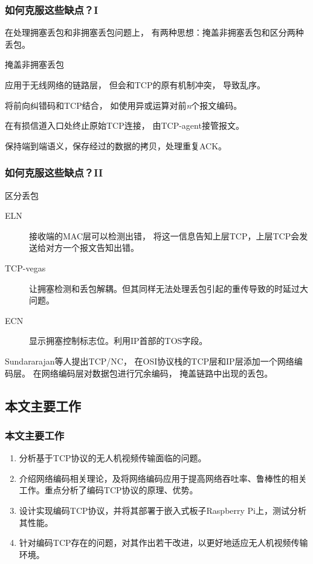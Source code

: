 \begin{frame}
	\frametitle{如何克服这些缺点？I}
	在处理拥塞丢包和非拥塞丢包问题上，
	有两种思想：掩盖非拥塞丢包和区分两种丢包。
	\begin{block}{掩盖非拥塞丢包}
		\begin{description}
			\footnotesize
			\item[ARQ] 应用于无线网络的链路层，
			但会和TCP的原有机制冲突，
			导致乱序。
			\item[FEC] 将前向纠错码和TCP结合，
			如使用异或运算对前\emph{n}个报文编码。
			\item[Indirect-TCP\footfullcite{Bakre1995I}] 在有损信道入口处终止原始TCP连接，
			由TCP-agent接管报文。
			\item[TCP-snoop\footfullcite{Balakrishnan1995Improving}] 保持端到端语义，保存经过的数据的拷贝，处理重复ACK。
		\end{description}
	\end{block}
\end{frame}

\begin{frame}
	\frametitle{如何克服这些缺点？II}
	\begin{block}{区分丢包}
		\footnotesize
		\begin{description}
			\item[ELN] 接收端的MAC层可以检测出错，
			将这一信息告知上层TCP，上层TCP会发送给对方一个报文告知出错。
			\item[TCP-vegas] 让拥塞检测和丢包解耦。但其同样无法处理丢包引起的重传导致的时延过大问题。
			\item[ECN] 显示拥塞控制标志位。利用IP首部的TOS字段。
		\end{description}
	\end{block}
	Sundararajan等人提出TCP/NC，
	在OSI协议栈的TCP层和IP层添加一个网络编码层。
	在网络编码层对数据包进行冗余编码，
	掩盖链路中出现的丢包。
\end{frame}

\subsection{本文主要工作}
\begin{frame}
	\frametitle{本文主要工作}
	\begin{enumerate}
		\item 分析基于TCP协议的无人机视频传输面临的问题。
		\item 介绍网络编码相关理论，及将网络编码应用于提高网络吞吐率、鲁棒性的相关工作。重点分析了编码TCP协议的原理、优势。
		\item 设计实现编码TCP协议，并将其部署于嵌入式板子Raspberry Pi上，测试分析其性能。
		\item 针对编码TCP存在的问题，对其作出若干改进，以更好地适应无人机视频传输环境。
	\end{enumerate}
\end{frame}